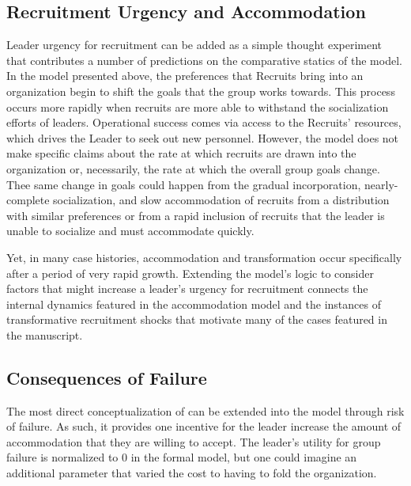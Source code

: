 \subsection{Recruitment Urgency and Accommodation}

Leader urgency for recruitment can be added as a simple thought experiment that contributes a number of predictions on the comparative statics of the model. In the model presented above, the preferences that Recruits bring into an organization begin to shift the goals that the group works towards. This process occurs more rapidly when recruits are more able to withstand the socialization efforts of leaders. Operational success comes via access to the Recruits' resources, which drives the Leader to seek out new personnel. However, the model does not make specific claims about the rate at which recruits are drawn into the organization or, necessarily, the rate at which the overall group goals change.  Thee same change in goals could happen from the gradual incorporation, nearly-complete socialization, and slow accommodation of recruits from a distribution with similar preferences or from a rapid inclusion of recruits that the leader is unable to socialize and must accommodate quickly.

Yet, in many case histories, accommodation and transformation occur specifically after a period of very rapid growth.  Extending the model's logic to consider factors that might increase a leader's urgency for recruitment connects the internal dynamics featured in the accommodation model and the instances of transformative recruitment shocks that motivate many of the cases featured in the manuscript.


\subsection{Consequences of Failure}

The most direct conceptualization of  can be extended into the model through risk of failure. As such, it provides one incentive for the leader increase the amount of accommodation that they are willing to accept. The leader's utility for group failure is normalized to 0 in the formal model, but one could imagine an additional parameter that varied the cost to having to fold the organization. 

